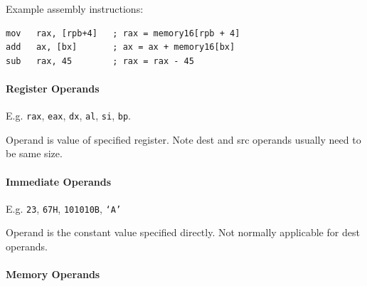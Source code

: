 \documentclass[twocolumn,english]{article}
\begin{document}
Example assembly instructions:

\noindent 
\begin{lstlisting}[basicstyle={\footnotesize\ttfamily},frame=single]
mov   rax, [rpb+4]   ; rax = memory16[rpb + 4]
add   ax, [bx]       ; ax = ax + memory16[bx]
sub   rax, 45        ; rax = rax - 45
\end{lstlisting}



\paragraph{Register Operands}

E.g. \texttt{rax}, \texttt{eax}, \texttt{dx}, \texttt{al}, \texttt{si},
\texttt{bp}.

Operand is value of specified register. Note dest and src operands
usually need to be same size.


\paragraph{Immediate Operands}

E.g. \texttt{23}, \texttt{67H}, \texttt{101010B}, \texttt{`A'}

Operand is the constant value specified directly. Not normally applicable
for dest operands.


\paragraph{Memory Operands}
\end{document}
